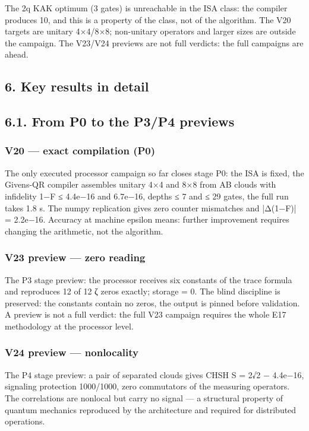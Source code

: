 \documentclass[11pt,a4paper]{article}
\begin{document}
The 2q KAK optimum (3 gates) is unreachable in the ISA class: the compiler produces 10, and this is a property of the class, not of the algorithm. The V20 targets are unitary 4×4/8×8; non-unitary operators and larger sizes are outside the campaign. The V23/V24 previews are not full verdicts: the full campaigns are ahead.

\subsection{6. Key results in detail}

\subsection{6.1. From P0 to the P3/P4 previews}

\subsubsection{V20 — exact compilation (P0)}

The only executed processor campaign so far closes stage P0: the ISA is fixed, the Givens-QR compiler assembles unitary 4×4 and 8×8 from AB clouds with infidelity 1−F ≤ 4.4e−16 and 6.7e−16, depths ≤ 7 and ≤ 29 gates, the full run takes 1.8 s. The numpy replication gives zero counter mismatches and |Δ(1−F)| = 2.2e−16. Accuracy at machine epsilon means: further improvement requires changing the arithmetic, not the algorithm.

\subsubsection{V23 preview — zero reading}

The P3 stage preview: the processor receives six constants of the trace formula and reproduces 12 of 12 ζ zeros exactly; storage = 0. The blind discipline is preserved: the constants contain no zeros, the output is pinned before validation. A preview is not a full verdict: the full V23 campaign requires the whole E17 methodology at the processor level.

\subsubsection{V24 preview — nonlocality}

The P4 stage preview: a pair of separated clouds gives CHSH S = 2√2 − 4.4e−16, signaling protection 1000/1000, zero commutators of the measuring operators. The correlations are nonlocal but carry no signal — a structural property of quantum mechanics reproduced by the architecture and required for distributed operations.
\end{document}
